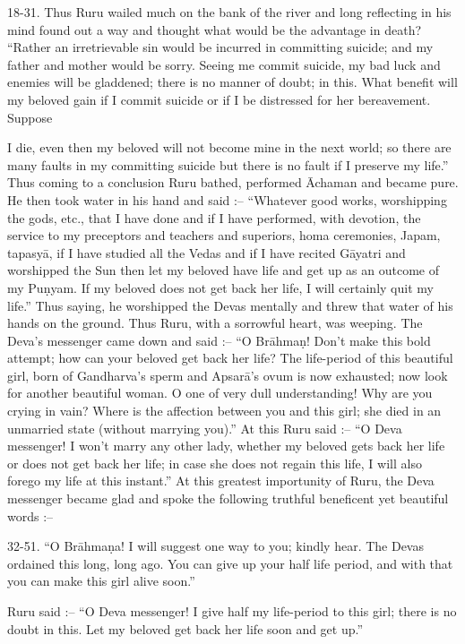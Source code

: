 18-31. Thus Ruru wailed much on the bank of the river and long reflecting in his mind found out a way and thought what would be the advantage in death? ``Rather an irretrievable sin would be incurred in committing suicide; and my father and mother would be sorry. Seeing me commit suicide, my bad luck and enemies will be gladdened; there is no manner of doubt; in this. What benefit will my beloved gain if I commit suicide or if I be distressed for her bereavement. Suppose

I die, even then my beloved will not become mine in the next world; so there are many faults in my committing suicide but there is no fault if I preserve my life.'' Thus coming to a conclusion Ruru bathed, performed \=Achaman and became pure. He then took water in his hand and said :-- ``Whatever good works, worshipping the gods, etc., that I have done and if I have performed, with devotion, the service to my preceptors and teachers and superiors, homa ceremonies, Japam, tapasy\=a, if I have studied all the Vedas and if I have recited G\=ayatri and worshipped the Sun then let my beloved have life and get up as an outcome of my Pu\d{n}yam. If my beloved does not get back her life, I will certainly quit my life.'' Thus saying, he worshipped the Devas mentally and threw that water of his hands on the ground. Thus Ruru, with a sorrowful heart, was weeping. The Deva's messenger came down and said :-- ``O Br\=ahma\d{n}! Don't make this bold attempt; how can your beloved get back her life? The life-period of this beautiful girl, born of Gandharva's sperm and Apsar\=a's ovum is now exhausted; now look for another beautiful woman. O one of very dull understanding! Why are you crying in vain? Where is the affection between you and this girl; she died in an unmarried state (without marrying you).'' At this Ruru said :-- ``O Deva messenger! I won't marry any other lady, whether my beloved gets back her life or does not get back her life; in case she does not regain this life, I will also forego my life at this instant.'' At this greatest importunity of Ruru, the Deva messenger became glad and spoke the following truthful beneficent yet beautiful words :--

32-51. ``O Br\=ahma\d{n}a! I will suggest one way to you; kindly hear. The Devas ordained this long, long ago. You can give up your half life period, and with that you can make this girl alive soon.''

Ruru said :-- ``O Deva messenger! I give half my life-period to this girl; there is no doubt in this. Let my beloved get back her life soon and get up.''


